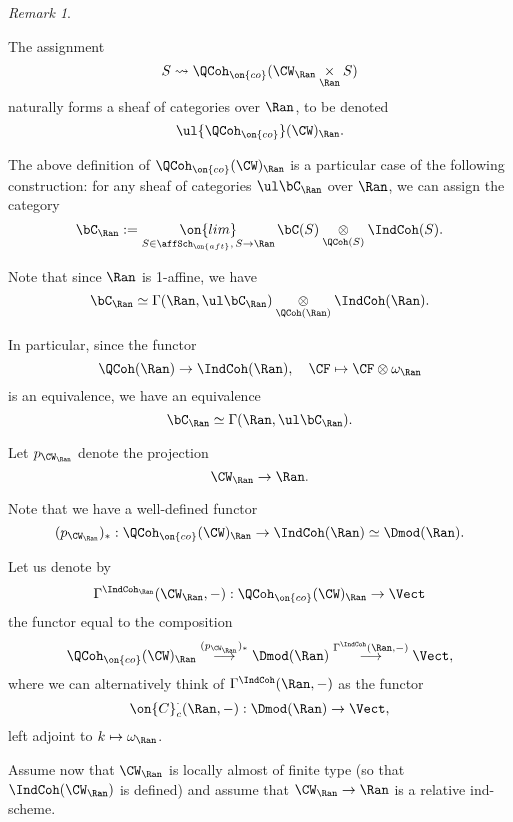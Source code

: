 \documentclass[9pt]{amsart}
\theoremstyle{remark}
\newtheorem{rem}[subsubsection]{Remark}
\theoremstyle{definition}
\theoremstyle{remark}
\newcommand{\secref}[1]{Sect.~\ref{#1}}
\numberwithin{equation}{section}
\begin{document}
\begin{rem} \label{r:QCoh* as a sheaf of cats}

The assignment 
$$S\rightsquigarrow \QCoh_{\on{co}}(\CW_\Ran\underset{\Ran}\times S)$$
naturally forms a sheaf of categories over $\Ran$, to be denoted
$$\ul{\QCoh_{\on{co}}}(\CW)_\Ran.$$

The above definition of $\QCoh_{\on{co}}(\CW)_\Ran$ is a particular case of the following construction: 
for any sheaf of categories $\ul\bC_\Ran$ over $\Ran$, we can assign the category
$$\bC_\Ran:=\underset{S\in \affSch_{\on{aft}},\,S\to \Ran}{\on{lim}}\, \bC(S)\underset{\QCoh(S)}\otimes \IndCoh(S).$$

Note that since $\Ran$ is 1-affine, we have
$$\bC_\Ran\simeq \Gamma(\Ran,\ul\bC_\Ran)\underset{\QCoh(\Ran)}\otimes \IndCoh(\Ran).$$

In particular, since the functor
$$\QCoh(\Ran)\to \IndCoh(\Ran), \quad \CF\mapsto \CF\otimes \omega_\Ran$$
is an equivalence, we have an equivalence
$$\bC_\Ran\simeq \Gamma(\Ran,\ul\bC_\Ran).$$

\end{rem} 





\sssec{}

Let $p_{\CW_\Ran}$ denote the projection
$$\CW_\Ran\to \Ran.$$

Note that we have a well-defined functor
$$(p_{\CW_\Ran})_*:\QCoh_{\on{co}}(\CW)_\Ran \to \IndCoh(\Ran)\simeq \Dmod(\Ran).$$

Let us denote by 
$$\Gamma^{\IndCoh_\Ran}(\CW_\Ran,-):\QCoh_{\on{co}}(\CW)_\Ran\to \Vect$$
the functor equal to the composition
$$\QCoh_{\on{co}}(\CW)_\Ran \overset{(p_{\CW_\Ran})_*}\longrightarrow \Dmod(\Ran) \overset{\Gamma^{\IndCoh}(\Ran,-)}\longrightarrow \Vect,$$
where we can alternatively think of $\Gamma^{\IndCoh}(\Ran,-)$ as the functor
$$\on{C}^\cdot_c(\Ran,-):\Dmod(\Ran)\to \Vect,$$
left adjoint to $k\mapsto \omega_{\Ran}$. 

%

\sssec{} \label{sss:IndCoh to iQCoh/Ran}

Assume now that $\CW_\Ran$ is locally almost of finite type (so that $\IndCoh(\CW_\Ran)$ is defined) 
and assume that $\CW_\Ran\to \Ran$ is a relative ind-scheme. 
\end{document}
